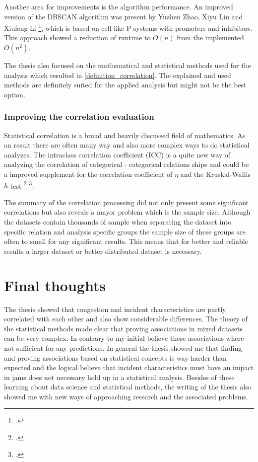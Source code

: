 Another area for improvements is the algorithm performance. An improved version of the DBSCAN algorithm was present by Yuzhen Zhao, Xiyu Liu and Xiufeng Li \footcite{https://journals.plos.org/plosone/article?id=10.1371/journal.pone.0200751}, which is based on cell-like P systems with promoters and inhibitors. This approach showed a reduction of runtime to $O(n)$ from the implemented $O(n^2)$.

\bigskip

The thesis also focused on the mathematical and statistical methods used for the analysis which resulted in \cref{definition_correlation}. The explained and used methods are definitely suited for the applied analysis but might not be the best option.

\subsubsection{Improving the correlation evaluation}
Statistical correlation is a broad and heavily discussed field of mathematics. As an result there are often many way and also more complex ways to do statistical analyzes. The intraclass correlation coefficient (ICC) is a quite new way of analyzing the correlation of categorical - categorical relations ships and could be a improved supplement for the correlation coefficient of $\eta$ and the Kruskal-Wallis $h$-test \footcite{https://stats.stackexchange.com/questions/73065/correlation-coefficient-between-a-non-dichotomous-nominal-variable-and-a-numer} \footcite{https://pingouin-stats.org/generated/pingouin.intraclass_corr.html}.

\bigskip

The summary of the correlation processing did not only present some significant correlations but also reveals a mayor problem which is the sample size. Although the datasets contain thousands of sample when separating the dataset into specific relation and analysis specific groups the sample size of these groups are often to small for any significant results. This means that for better and reliable results a larger dataset or better distributed dataset is necessary.

\section{Final thoughts}
The thesis showed that congestion and incident characteristics are partly correlated with each other and also show considerable differences. The theory of the statistical methods made clear that proving associations in mixed datasets can be very complex. In contrary to my initial believe these associations where not sufficient for any predictions. In general the thesis showed me that finding and proving associations based on statistical concepts is way harder than expected and the logical believe that incident characteristics must have an impact in jams does not necessary hold up in a statistical analysis. Besides of these learning about data science and statistical methods, the writing of the thesis also showed me with new ways of approaching research and the associated problems. 

